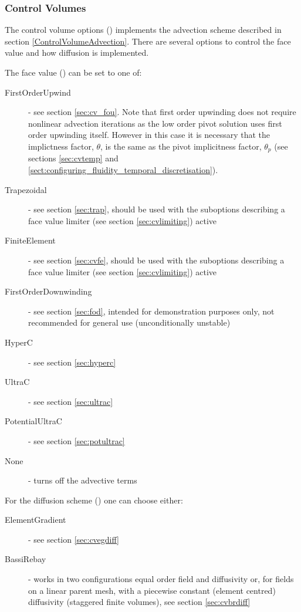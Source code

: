 \subsubsection{Control Volumes}\label{Sect:CVs}

The control volume options () implements the advection scheme described in section \ref{ControlVolumeAdvection}. There are 
several options to control the face value and how diffusion is implemented.

The face value () can be set to one of:
\begin{description}
\item[FirstOrderUpwind] - see section \ref{sec:cv_fou}.  Note that first order upwinding does not require nonlinear advection iterations as the low order pivot solution uses first order upwinding itself.  However in this case it is necessary that the implictness factor, $\theta$, is the same as the pivot implicitness factor, $\theta_p$ (see sections \ref{sec:cvtemp} and \ref{sect:configuring_fluidity_temporal_discretisation}).
\item[Trapezoidal] - see section \ref{sec:trap}, should be used with the suboptions describing a face value limiter (see section \ref{sec:cvlimiting}) active
\item[FiniteElement] - see section \ref{sec:cvfe}, should be used with the suboptions describing a face value limiter (see section \ref{sec:cvlimiting}) active
\item[FirstOrderDownwinding] - see section \ref{sec:fod}, intended for demonstration purposes only, not recommended for general use (unconditionally unstable)
\item[HyperC] - see section \ref{sec:hyperc}
\item[UltraC] - see section \ref{sec:ultrac}
\item[PotentialUltraC] - see section \ref{sec:potultrac}
\item[None] - turns off the advective terms
\end{description}

For the diffusion scheme () one can choose either:
\begin{description}
\item[ElementGradient] - see section \ref{sec:cvegdiff}
\item[BassiRebay] - works in two configurations equal order field and diffusivity or, for fields on a linear parent mesh, with a piecewise constant (element centred) diffusivity (staggered finite volumes), see section \ref{sec:cvbrdiff}
\end{description}

